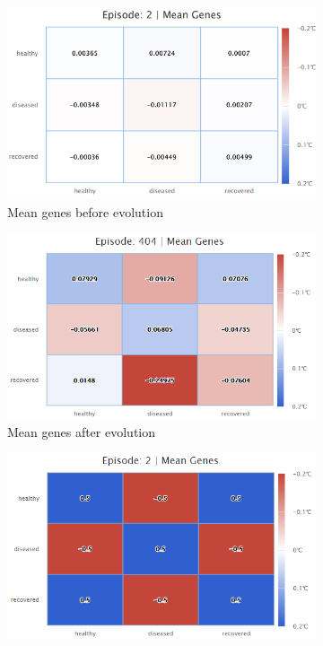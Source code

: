 \documentclass[a4paper,11pt]{article}
\begin{document}
    \begin{figure}[h]
        \centering
        \begin{subfigure}[b]{0.32\linewidth}
            \includegraphics[width=\linewidth]{diagrams/SN14_MeanGenes.PNG}
            \caption{Mean genes before evolution}
            \label{fig:4.2a}
        \end{subfigure}
        \begin{subfigure}[b]{0.33\linewidth}
            \includegraphics[width=\linewidth]{diagrams/SN15_MeanGenes.PNG}
            \caption{Mean genes after evolution}
            \label{fig:4.2b}
        \end{subfigure}
        \begin{subfigure}[b]{0.33\linewidth}
            \includegraphics[width=\linewidth]{diagrams/perfect_genes.PNG}

\end{subfigure}
\end{figure}
\end{document}
